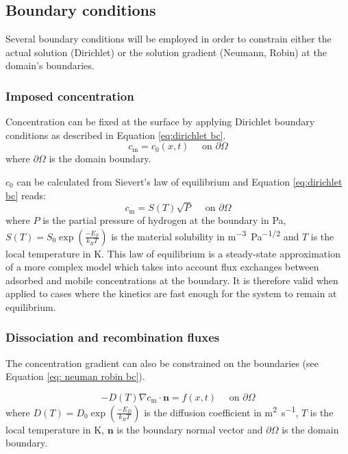 
\subsection{Boundary conditions}

Several boundary conditions will be employed in order to constrain either the actual solution (Dirichlet) or the solution gradient (Neumann, Robin) at the domain's boundaries.

\subsubsection{Imposed concentration}

Concentration can be fixed at the surface by applying Dirichlet boundary conditions as described in Equation \ref{eq:dirichlet bc}.
\begin{equation}
    c_\mathrm{m} = c_0(x, t) \quad \text { on } \partial \Omega
    \label{eq:dirichlet bc}
\end{equation}
where $\partial \Omega$ is the domain boundary.

$c_0$ can be calculated from Sievert's law of equilibrium and Equation \ref{eq:dirichlet bc} reads:
\begin{equation}
    c_\mathrm{m} = S(T) \sqrt{P}\quad \text { on } \partial \Omega
\end{equation}
where $P$ is the partial pressure of hydrogen at the boundary in \si{Pa}, $S(T)=S_0 \exp(\frac{-E_S}{k_B T})$ is the material solubility in \si{m^{-3}.Pa^{-1/2}} and $T$ is the local temperature in \si{K}.
This law of equilibrium is a steady-state approximation of a more complex model which takes into account flux exchanges between adsorbed and mobile concentrations at the boundary.
It is therefore valid when applied to cases where the kinetics are fast enough for the system to remain at equilibrium.

\subsubsection{Dissociation and recombination fluxes}

The concentration gradient can also be constrained on the boundaries (see Equation \ref{eq: neuman robin bc}).

\begin{equation}
    - D(T)\nabla c_\mathrm{m} \cdot \mathbf{n} = f(x, t) \quad \text { on } \partial \Omega
    \label{eq: neuman robin bc}
\end{equation}
where $D(T) = D_0 \exp(\frac{-E_D}{k_B T}) $ is the diffusion coefficient in \si{m^2.s^{-1}}, $T$ is the local temperature in \si{K}, $\mathbf{n}$ is the boundary normal vector and $\partial \Omega$ is the domain boundary.

